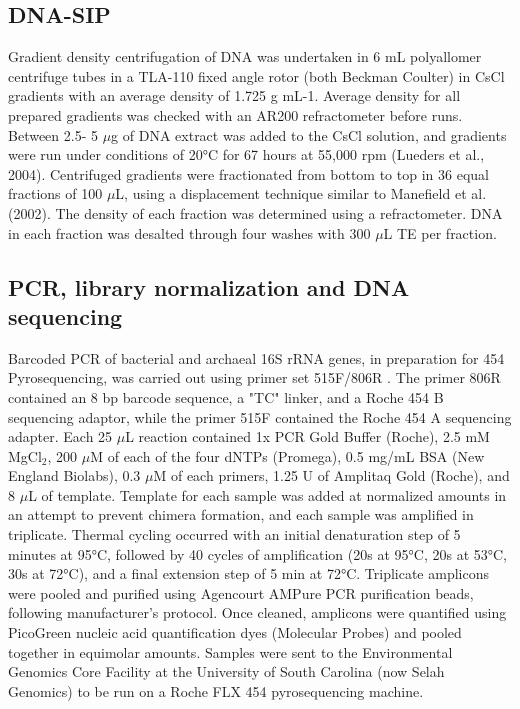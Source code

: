 \subsection{DNA-SIP}
 Gradient density centrifugation of DNA was undertaken in 6 mL polyallomer
 centrifuge tubes in a TLA-110 fixed angle rotor (both Beckman Coulter) in CsCl
 gradients with an average density of 1.725 g mL-1.  Average density for all
 prepared gradients was checked with an AR200 refractometer before runs.
 Between 2.5- 5 $\mu$g of DNA extract was added to the CsCl solution, and
 gradients were run under conditions of 20°C for 67 hours at 55,000 rpm
 (Lueders et al., 2004). Centrifuged gradients were fractionated from bottom to
 top in 36 equal fractions of 100 $\mu$L, using a displacement technique
 similar to Manefield et al. (2002). The density of each fraction was
 determined using a refractometer. DNA in each fraction was desalted through
 four washes with 300 $\mu$L TE per fraction.  \subsection{PCR, library
 normalization and DNA sequencing} Barcoded PCR of bacterial and archaeal 16S
 rRNA genes, in preparation for 454 Pyrosequencing, was carried out using
 primer set 515F/806R \citep{21349862}.  The primer 806R contained an 8 bp
 barcode sequence, a "TC" linker, and a Roche 454 B sequencing adaptor, while
 the primer 515F contained the Roche 454 A sequencing adapter. Each 25 $\mu$L
 reaction contained 1x PCR Gold Buffer (Roche), 2.5 mM MgCl$_{2}$, 200 $\mu$M
 of each of the four dNTPs (Promega), 0.5 mg/mL BSA (New England Biolabs), 0.3
 $\mu$M of each primers, 1.25 U of Amplitaq Gold (Roche), and 8 $\mu$L of
 template. Template for each sample was added at normalized amounts in an
 attempt to prevent chimera formation, and each sample was amplified in
 triplicate. Thermal cycling occurred with an initial denaturation step of 5
 minutes at 95°C, followed by 40 cycles of amplification (20s at 95°C, 20s at
 53°C, 30s at 72°C), and a final extension step of 5 min at 72°C. Triplicate
 amplicons were pooled and purified using Agencourt AMPure PCR purification
 beads, following manufacturer’s protocol. Once cleaned, amplicons were
 quantified using PicoGreen nucleic acid quantification dyes (Molecular Probes)
 and pooled together in equimolar amounts. Samples were sent to the
 Environmental Genomics Core Facility at the University of South Carolina (now
 Selah Genomics) to be run on a Roche FLX 454 pyrosequencing machine. 

